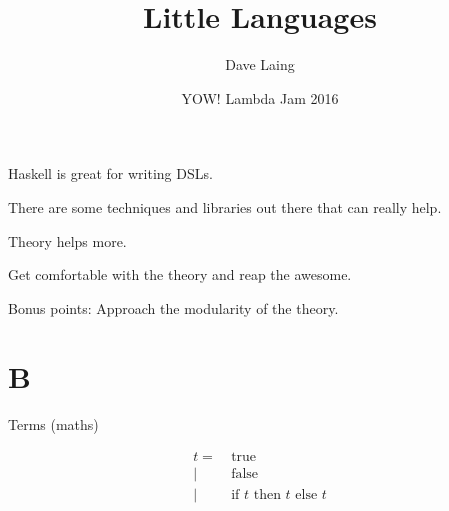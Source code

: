 \documentclass[aspectration=169]{beamer}
\title{Little Languages}
\author{Dave Laing}
\date{YOW! Lambda Jam 2016}
\begin{document}
\begin{frame}
\maketitle
\end{frame}

\begin{frame}[c]
  \begin{center}
    Haskell is great for writing DSLs.
  \end{center}
\end{frame}

\begin{frame}[c]
  \begin{center}
    There are some techniques and libraries out there that can really help.
  \end{center}
\end{frame}

\begin{frame}[c]
  \begin{center}
    Theory helps more.
  \end{center}
\end{frame}

\begin{frame}[c]
  \begin{center}
    Get comfortable with the theory and reap the awesome.
  \end{center}
\end{frame}

\begin{frame}[c]
  \begin{center}
   Bonus points: Approach the modularity of the theory. 
  \end{center}
\end{frame}

\section{B}

\begin{frame}[c]
  \begin{center}
Terms (maths)
  \end{center}
  \begin{displaymath}
    \begin{aligned}
t =& \ \text{true} \\
  |& \ \text{false}  \\
  |& \ \text{if $t$ then $t$ else $t$}
    \end{aligned}
  \end{displaymath}
\end{frame}
\end{document}
